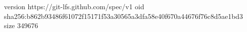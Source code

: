 version https://git-lfs.github.com/spec/v1
oid sha256:b862b93486f61072f15171f53a30565a3dfa58e40f670a44676f76c8d5ae1bd3
size 349676
